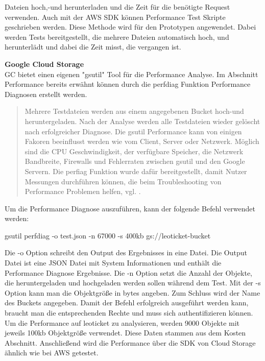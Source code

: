 Dateien hoch,-und herunterladen und die Zeit für die benötigte Request verwenden. Auch mit der AWS SDK können Performance Test Skripte geschrieben werden. Diese Methode wird für den Prototypen angewendet. Dabei werden Tests bereitgestellt, die mehrere Dateien automatisch hoch, und herunterlädt und dabei die Zeit misst, die vergangen ist. 

\newpage

\textbf{Google Cloud Storage}\\

GC bietet einen eigenen "gsutil" Tool für die Performance Analyse. Im Abschnitt Performance bereits erwähnt können durch die perfdiag Funktion Performance Diagnosen erstellt werden. 

\begin{quote}
	Mehrere Testdateien werden aus einem angegebenen Bucket hoch-und heruntergeladen. Nach der Analyse werden alle Testdateien wieder gelöscht nach erfolgreicher Diagnose. Die gsutil Performance kann von einigen Fakoren beeinflusst werden wie vom Client, Server oder Netzwerk. Möglich sind die CPU Geschwindigkeit, der verfügbare Speicher, die Netzwerk Bandbreite, Firewalls und Fehlerraten zwischen gsutil und den Google Servern. Die perfiag Funktion wurde dafür bereitgestellt, damit Nutzer Messungen durchführen können, die beim Troubleshooting von Performance Problemen helfen, vgl. \cite{gc-perfdiag}.
\end{quote}

Um die Performance Diagnose auszuführen, kann der folgende Befehl verwendet werden:

\begin{code} gsutil perfdiag -o test.json -n 67000 -s 400kb gs://leoticket-bucket \end{code}

Die -o Option schreibt den Output des Ergebnisses in eine Datei. Die Output Datei ist eine JSON Datei mit System Informationen und enthält die Performance Diagnose Ergebnisse. Die -n Option setzt die Anzahl der Objekte, die heruntergeladen und hochgeladen werden sollen während dem Test. Mit der -s Option kann man die Objektgröße in bytes angeben. Zum Schluss wird der Name des Buckets angegeben. Damit der Befehl erfolgreich ausgeführt werden kann, braucht man die entsprechenden Rechte und muss sich authentifizieren können. Um die Performance auf leoticket zu analysieren, werden 9000 Objekte mit jeweils 100kb Objektgröße verwendet. Diese Daten stammen aus dem Kosten Abschnitt. Anschließend wird die Performance über die SDK von Cloud Storage ähnlich wie bei AWS getestet. 

\newpage